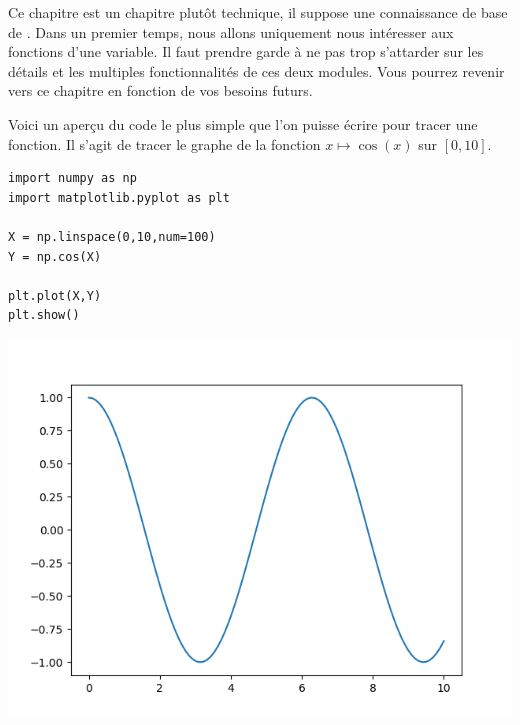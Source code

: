 \documentclass[11pt,class=report,crop=false]{standalone}
\begin{document}


\bigskip

Ce chapitre est un chapitre plutôt technique, il suppose une connaissance de base de \Python.
Dans un premier temps, nous allons uniquement nous intéresser aux fonctions d'une variable.
Il faut prendre garde à ne pas trop s'attarder sur les détails et les multiples fonctionnalités de ces deux modules. Vous pourrez revenir vers ce chapitre en fonction de vos besoins futurs.

Voici un aperçu du code le plus simple que l'on puisse écrire pour tracer une fonction.
Il s'agit de tracer le graphe de la fonction $x \mapsto \cos(x)$ sur $[0,10]$.

\begin{minipage}{0.45\textwidth}
\begin{lstlisting}
import numpy as np
import matplotlib.pyplot as plt

X = np.linspace(0,10,num=100)
Y = np.cos(X)

plt.plot(X,Y)
plt.show()
\end{lstlisting}
\end{minipage}
\begin{minipage}{0.49\textwidth}
\begin{center}
\includegraphics[scale=\myscale,scale=0.55]{figures/pythonx-intro}
\end{center}
\end{minipage}
\end{document}
